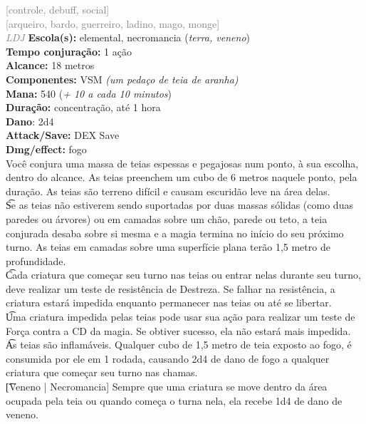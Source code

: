 \documentclass{RPG_Adventure}[2021/10/20]
\begin{document}
{\scriptsize \textcolor{gray}{[controle, debuff, social]\\}}
{\scriptsize \textcolor{gray}{[arqueiro, bardo, guerreiro, ladino, mago, monge]\\}}
{\tiny \textcolor{gray}{\textit{LDJ}}}\jump{}
{\small \t \textbf{Escola(s):} elemental, necromancia (\textit{terra, veneno})\\\t \textbf{Tempo conjuração:} 1 ação\\\t \textbf{Alcance:} 18 metros\\\t \textbf{Componentes:} VSM \textit{(um pedaço de teia de aranha)}\\\t \textbf{Mana:} 540 (\textit{+ 10 a cada 10 minutos})\\\t \textbf{Duração:} concentração, até 1 hora\\\t \textbf{Dano}: 2d4\\\t \textbf{Attack/Save:} DEX Save\\\t \textbf{Dmg/effect:} fogo\\}
{\normalsize Você conjura uma massa de teias espessas e pegajosas num ponto, à sua escolha, dentro do alcance. As teias preenchem um cubo de 6 metros naquele ponto, pela duração. As teias são terreno difícil e causam escuridão leve na área delas.\\\t Se as teias não estiverem sendo suportadas por duas massas sólidas (como duas paredes ou árvores) ou em camadas sobre um chão, parede ou teto, a teia conjurada desaba sobre si mesma e a magia termina no início do seu próximo turno. As teias em camadas sobre uma superfície plana terão 1,5 metro de profundidade.\\\t Cada criatura que começar seu turno nas teias ou entrar nelas durante seu turno, deve realizar um teste de resistência de Destreza. Se falhar na resistência, a criatura estará impedida enquanto permanecer nas teias ou até se libertar.\\\t Uma criatura impedida pelas teias pode usar sua ação para realizar um teste de Força contra a CD da magia. Se obtiver sucesso, ela não estará mais impedida.\\\t As teias são inflamáveis. Qualquer cubo de 1,5 metro de teia exposto ao fogo, é consumida por ele em 1 rodada, causando 2d4 de dano de fogo a qualquer criatura que começar seu turno nas chamas.\\\t [Veneno | Necromancia] Sempre que uma criatura se move dentro da área ocupada pela teia ou quando começa o turna nela, ela recebe 1d4 de dano de veneno.\\}
\end{document}
